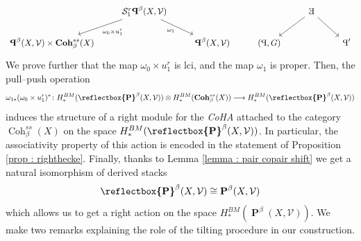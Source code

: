\documentclass[11pt]{article}
\newcommand{\segal}{\mathcal{S}}
\newcommand{\cohbetass}{\operatorname{Coh}^{ss}_{\beta}(X)}
\newcommand{\cohbetassstack}{\boldsymbol{\operatorname{Coh}}^{ss}_{\beta}(X)}
\newcommand{\copairs}{\boldsymbol{\cop}^{\beta}(X,\mathcal{V})}
\newcommand{\pairs}{\boldsymbol{\operatorname{P}}^{\beta}(X,\mathcal{V})}
\newcommand{\cop}{\reflectbox{\ensuremath{\operatorname{P}}}}
\newcommand{\coext}{\reflectbox{\ensuremath{\operatorname{E}}}}
\begin{document}
\begin{equation}\label{eqn : convolution right}
\begin{tikzcd}
	& {\segal^r_1\copairs} &&& {\coext} & \\
	{\copairs \times \cohbetassstack} && \copairs & {(\cop,G)} && {\cop'}
	\arrow["{\omega_0\times u^r_1}", from=1-2, to=2-1]
	\arrow["{\omega_1}"', from=1-2, to=2-3]
	\arrow[from=1-5, to=2-4]
	\arrow[from=1-5, to=2-6]
\end{tikzcd}
\end{equation}
We prove further that the map $\omega_0 \times u_1^r$ is lci, and the map $\omega_1$ is proper. Then, the pull--push operation
 \[
    \omega_{1*} (\omega_0\times u^r_1)^* \colon H^{BM}_*(\copairs) \otimes H^{BM}_*(\cohbetassstack) \longrightarrow H^{BM}_*(\copairs)
 \]
 induces the structure of a right module for the \textit{CoHA} attached to the category $\cohbetass$ on the space $H^{BM}_*(\copairs)$. In particular, the associativity property of this action is encoded in the statement of Proposition \ref{prop : righthecke}. Finally, thanks to Lemma \ref{lemma : pair copair shift} we get a natural isomorphism of derived stacks
 \[
    \copairs \cong \pairs
 \]
 which allows us to get a right action on the space $H^{BM}_*(\pairs)$. We make two remarks explaining the role of the tilting procedure in our construction.
\end{document}
